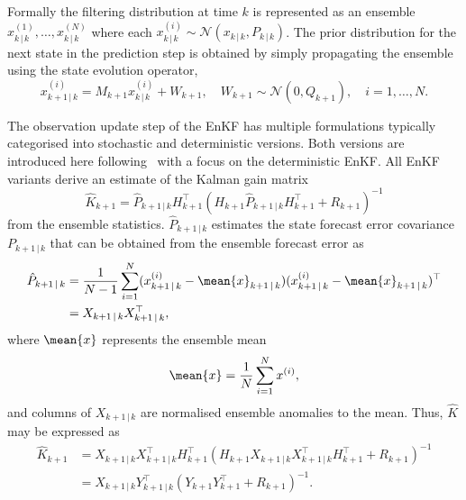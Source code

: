 Formally the filtering distribution at time $k$ is represented as an ensemble $x_{k \, \vert \, k}^{(1)}, \dots , x_{k \, \vert \, k}^{(N)}$ where each $x_{k \, \vert \, k}^{(i)} \sim \mathcal{N}(x_{k\,\vert\,k}, P_{k\,\vert\,k})$.
The prior distribution for the next state in the prediction step is obtained by simply propagating the ensemble using the state evolution operator,
\begin{equation*}
    x_{k+1\,\vert\,k}^{(i)} = M_{k+1} x_{k\,\vert\,k}^{(i)} + W_{k+1}, \quad W_{k+1} \sim \mathcal{N}(0, Q_{k+1}), \quad i = 1,\dots , N.
\end{equation*}

The observation update step of the EnKF has multiple formulations typically categorised into stochastic and deterministic versions.
Both versions are introduced here following~\cite{enkfbook} with a focus on the deterministic EnKF\@.
All EnKF variants derive an estimate of the Kalman gain matrix
\begin{equation*}
    \hat{K}_{k+1} = \hat{P}_{k+1\,\vert\,k} H_{k+1}^{\top} (H_{k+1}\hat{P}_{k+1\,\vert\,k}H_{k+1}^{\top} + R_{k+1})^{-1}
\end{equation*}
from the ensemble statistics.
$\hat{P}_{k+1\,\vert\,k}$ estimates the state forecast error covariance $P_{k+1\,\vert\,k}$ that can be obtained from the ensemble forecast error as
\begin{subequations}
    \begin{align*}
        \hat{P}_{k+1\,\vert\,k} &= \frac{1}{N-1} \sum_{i=1}^{N} (x_{k+1 \, \vert \, k}^{(i)} - \mean{x}_{k+1\,\vert\,k}) (x_{k+1 \, \vert \, k}^{(i)} - \mean{x}_{k+1\,\vert\,k})^{\top}\\
                                &= X_{k+1 \, \vert \, k} X_{k+1 \, \vert \, k}^{\top},
    \end{align*}
\end{subequations}
where $\mean{x}$ represents the ensemble mean
\begin{equation*}
    \mean{x} = \frac{1}{N} \sum_{i=1}^{N} x^{(i)},
\end{equation*}
and columns of $X_{k+1 \, \vert \, k}$ are normalised ensemble anomalies to the mean.
Thus, $\hat{K}$ may be expressed as
\begin{align*}
    \hat{K}_{k+1} &= X_{k+1 \, \vert \, k} X_{k+1 \, \vert \, k}^{\top} H_{k+1}^{\top} (H_{k+1}  X_{k+1 \, \vert \, k} X_{k+1 \, \vert \, k}^{\top} H_{k+1}^{\top} + R_{k+1})^{-1}\\
                  &= X_{k+1 \, \vert \, k} Y_{k+1 \, \vert \, k}^{\top} (Y_{k+1} Y_{k+1}^{\top} + R_{k+1})^{-1}.
\end{align*}


